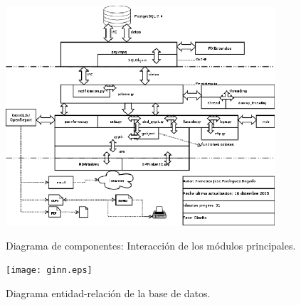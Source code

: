 \documentclass[a4paper]{article}
\begin{document}
    \begin{figure}[!ht]
        \centering
                \includegraphics[width=10cm]{Esquema_modulos.eps}\\
            \caption{Diagrama de componentes: Interacción de los módulos principales.}
            \label{diagrama:componentes}
    \end{figure}\par

    \begin{figure}[!ht]
        \centering
                \texttt{[image: ginn.eps]}\\
            \caption{Diagrama entidad-relación de la base de datos.}
            \label{diagrama:er}
    \end{figure}\par
    
\end{document}
